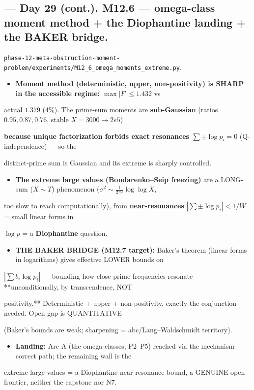 \documentclass[10pt]{article}
\begin{document}
\subsection*{ --- Day 29 (cont.). M12.6 --- omega-class moment method + the Diophantine landing + the BAKER bridge.}
\texttt{phase-12-meta-obstruction-moment-problem/experiments/M12\_6\_omega\_moments\_extreme.py}.\par
\begin{itemize}
\item \textbf{Moment method (deterministic, upper, non-positivity) is SHARP in the accessible regime:} $\max|F|\le1.432$ vs
\end{itemize}
  actual $1.379$ (4\%). The prime-sum moments are \textbf{sub-Gaussian} (ratios $0.95,0.87,0.76$, stable $X=3000\to2e5$)\par
  \textbf{because unique factorization forbids exact resonances $\sum\pm\log p_i=0$} (Q-independence) --- so the\par
  distinct-prime sum is Gaussian and its extreme is sharply controlled.\par
\begin{itemize}
\item \textbf{The extreme large values (Bondarenko--Seip freezing)} are a LONG-sum ($X\sim T$) phenomenon ($\sigma^2\sim\frac1{2\pi^2}\log\log X$,
\end{itemize}
  too slow to reach computationally), from \textbf{near-resonances} $|\sum\pm\log p_i|<1/W$ = small linear forms in\par
  $\log p$ = a \textbf{Diophantine} question.\par
\begin{itemize}
\item \textbf{THE BAKER BRIDGE (M12.7 target):} Baker's theorem (linear forms in logarithms) gives effective LOWER bounds on
\end{itemize}
  $|\sum b_i\log p_i|$ --- bounding how close prime frequencies resonate --- **unconditionally, by transcendence, NOT\par
  positivity.** Deterministic + upper + non-positivity, exactly the conjunction needed. Open gap is QUANTITATIVE\par
  (Baker's bounds are weak; sharpening = abc/Lang--Waldschmidt territory).\par
\begin{itemize}
\item \textbf{Landing:} Arc A (the omega-classes, P2--P5) reached via the mechanism-correct path; the remaining wall is the
\end{itemize}
  extreme large values = a Diophantine near-resonance bound, a GENUINE open frontier, neither the capstone nor N7.\par
\end{document}
